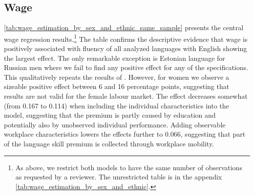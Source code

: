 \documentclass[12pt, a4paper]{article}
\begin{document}
\subsection{Wage}
\label{subsec:basic_model_wage}

\cref{tab:wage_estimation_by_sex_and_ethnic_same_sample} presents the
central wage regression
results.\footnote{As above, we
  restrict both models to have the same number of observations as
  requested by a reviewer.  The unrestricted table is in the appendix \cref{tab:wage_estimation_by_sex_and_ethnic}.}
The table
confirms the descriptive evidence that wage is positively associated
with fluency of all analyzed languages with English showing the
largest effect.  The only remarkable exception is
Estonian language for Russian men where we fail to find any positive
effect for any of the specifications.  This qualitatively repeats the results of
\citet{Toomet2011}. However, for women we observe a sizeable
positive effect between 6 and 16 percentage points, suggesting that
\citet{Toomet2011} results are not valid for the female labour market.  The effect decreases somewhat
(from 0.167 to 0.114) when including the individual characteristics
into the model, suggesting that the premium
is partly caused by education and potentially also by unobserved
individual performance.  Adding observable workplace characteristics
lowers the effects further to 0.066, suggesting that part of the
language skill premium is collected through workplace mobility.
\end{document}

